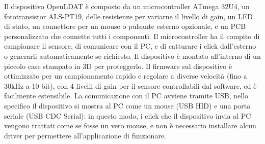 \documentclass[a4paper]{article}
\begin{document}
Il dispositivo OpenLDAT è composto da un microcontroller ATmega 32U4, un fototransistor ALS-PT19, delle resistenze per variarne il livello di gain, un LED di stato, un connettore per un mouse o pulsante esterno opzionale, e un PCB personalizzato che connette tutti i componenti. Il microcontroller ha il compito di campionare il sensore, di comunicare con il PC, e di catturare i click dall'esterno o generarli automaticamente se richiesto. Il dispositivo è montato all'interno di un piccolo case stampato in 3D per proteggerlo. Il firmware sul dispositivo è ottimizzato per un campionamento rapido e regolare a diverse velocità (fino a 30kHz a 10 bit), con 4 livelli di gain per il sensore controllabili dal software, ed è facilmente estensibile. La comunicazione con il PC avviene tramite USB, nello specifico il dispositivo si mostra al PC come un mouse (USB HID) e una porta seriale (USB CDC Serial): in questo modo, i click che il dispositivo invia al PC vengono trattati come se fosse un vero mouse, e non è necessario installare alcun driver per permettere all'applicazione di funzionare.
\end{document}
